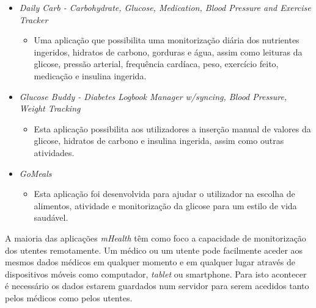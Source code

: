 \begin{itemize}
  \item \textit{Daily Carb - Carbohydrate, Glucose, Medication, Blood Pressure and Exercise Tracker} \cite{mhealth_app1}
  \begin{itemize}
    \item Uma aplica\c c\~ao que possibilita uma monitoriza\c c\~ao di\'aria dos nutrientes ingeridos, hidratos de carbono, gorduras e \'agua, assim como leituras da glicose, press\~ao arterial, frequ\^encia card\'iaca, peso, exerc\'icio feito, medica\c c\~ao e insulina ingerida.
  \end{itemize}
  \item \textit{Glucose Buddy - Diabetes Logbook Manager w/syncing, Blood Pressure, Weight Tracking} \cite{mhealth_app2}
   \begin{itemize}
    \item Esta aplica\c c\~ao possibilita aos utilizadores a inser\c c\~ao manual de valores da glicose, hidratos de carbono e insulina ingerida, assim como outras atividades.
  \end{itemize}
  \item \textit{GoMeals} \cite{mhealth_app3}
     \begin{itemize}
    \item Esta aplica\c c\~ao foi desenvolvida para ajudar o utilizador na escolha de alimentos, atividade e monitoriza\c c\~ao da glicose  para um  estilo de vida saud\'avel.
  \end{itemize}
\end{itemize}
A maioria das aplica\c c\~oes \textit{mHealth} t\^em como foco a capacidade de monitoriza\c c\~ao dos utentes remotamente. Um m\'edico ou um utente pode facilmente aceder aos mesmos dados m\'edicos em qualquer momento e em qualquer lugar atrav\'es de dispositivos m\'oveis como computador, \textit{tablet} ou smartphone. Para isto acontecer é necessário os dados estarem guardados num servidor para serem acedidos tanto pelos médicos como pelos utentes.








